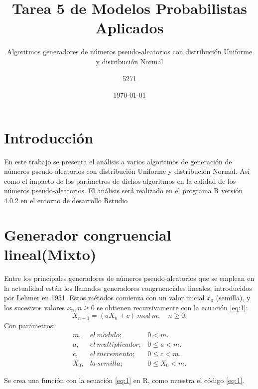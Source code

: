 \documentclass{article}
\title{Tarea 5 de Modelos Probabilistas Aplicados}
\subtitle{Algoritmos generadores de números pseudo-aleatorios con distribución Uniforme y distribución Normal}
\author{5271}
\date{\today}
\begin{document}
\maketitle

\section{Introducción}

En este trabajo se presenta el análisis a varios algoritmos de generación de números pseudo-aleatorios con distribución Uniforme y distribución Normal. Así como el impacto de los parámetros de dichos algoritmos en la calidad de los números pseudo-aleatorios. El análisis será realizado en el programa R versión 4.0.2 \cite{r} en el entorno de desarrollo Rstudio \cite{rstudio}

\section{Generador congruencial lineal(Mixto)}

Entre los principales generadores de números pseudo-aleatorios que se emplean en la actualidad están los llamados generadores congruenciales lineales, introducidos por Lehmer en 1951. Estos métodos comienza con un valor inicial $x_{0}$ (semilla), y los sucesivos valores $x_{n}, n\geq 0$ se obtienen recursivamente con la ecuación \ref{eq:1}:
\begin{equation}
    X_{n+1}= (aX_{n}+c)\: mod \: m,\quad n\geq 0.
    \label{eq:1}
\end{equation}
Con parámetros:
\begin{equation}\label{eq:2}
\begin{array}{llll}

 m, & el\:  m\acute{o}dulo;& 0<m.\\
 a, & el\:  multiplicador;& 0\leq a<m.\\
 c, & el\:  incremento;& 0\leq c<m.\\
 X_{0},& la\:  semilla;& 0\leq X_{0}<m.
\end{array}
\end{equation}

Se crea una función con la ecuación \ref{eq:1} en R, como muestra el código \ref{eq:1}. 
\begin{center}

\label{cod:1}
\end{center}
\end{document}
